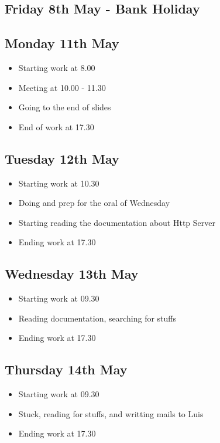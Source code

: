 \documentclass[a4paper, 10pt]{article}
\begin{document}
\subsection*{Friday 8th May - Bank Holiday}

\subsection*{Monday 11th May}
\begin{itemize}
    \item Starting work at 8.00
    \item Meeting at 10.00 - 11.30
    \item Going to the end of slides
    \item End of work at 17.30
\end{itemize}

\subsection*{Tuesday 12th May}
\begin{itemize}
    \item Starting work at 10.30
    \item Doing and prep for the oral of Wednesday
    \item Starting reading the documentation about Http Server
    \item Ending work at 17.30
\end{itemize}

\subsection*{Wednesday 13th May}
\begin{itemize}
    \item Starting work at 09.30
    \item Reading documentation, searching for stuffs
    \item Ending work at 17.30
\end{itemize}

    \subsection*{Thursday 14th May}
\begin{itemize}
    \item Starting work at 09.30
    \item Stuck, reading for stuffs, and writting mails to Luis
    \item Ending work at 17.30
\end{itemize}
\end{document}
